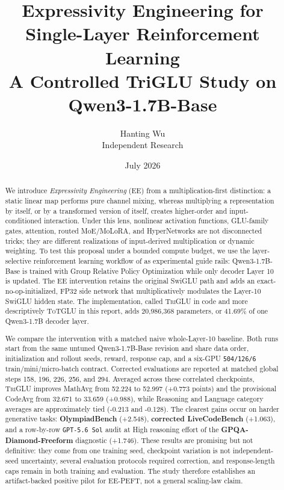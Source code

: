 \documentclass[10pt]{article}
\title{\vspace{-1.5em}\textbf{Expressivity Engineering for Single-Layer Reinforcement Learning}\\
\large A Controlled TriGLU Study on Qwen3-1.7B-Base}
\author{Hanting Wu\\\small Independent Research}
\date{July 2026}
\newcommand{\EE}{\textit{Expressivity Engineering}}
\newcommand{\TriGLU}{\textsc{TriGLU}}
\newcommand{\ToTGLU}{\textsc{ToTGLU}}
\begin{document}
\maketitle

\begin{abstract}
We introduce \EE{} (EE) from a multiplication-first distinction: a static
linear map performs pure channel mixing, whereas multiplying a representation
by itself, or by a transformed version of itself, creates higher-order and
input-conditioned interaction.  Under this lens, nonlinear activation
functions, GLU-family gates, attention, routed MoE/MoLoRA, and HyperNetworks
are not disconnected tricks; they are different realizations of input-derived
multiplication or dynamic weighting.  To test this proposal under a bounded
compute budget, we use the layer-selective reinforcement learning workflow of
\citet{zhang2026onelayer} as experimental guide rails:
Qwen3-1.7B-Base is trained with Group Relative Policy Optimization while only
decoder Layer 10 is updated.  The EE intervention retains the original SwiGLU
path and adds an exact-no-op-initialized, FP32 side network that multiplicatively
modulates the Layer-10 SwiGLU hidden state.  The implementation, called
\TriGLU{} in code and more descriptively \ToTGLU{} in this report, adds
20,986,368 parameters, or 41.69\% of one Qwen3-1.7B decoder layer.

We compare the intervention with a matched naive whole-Layer-10 baseline.  Both
runs start from the same untuned Qwen3-1.7B-Base revision and share data order,
initialization and rollout seeds, reward, response cap, and a six-GPU
\texttt{504/126/6} train/mini/micro-batch contract.  Corrected evaluations are
reported at matched global steps 158, 196, 226, 256, and 294.  Averaged across
these correlated checkpoints, \TriGLU{} improves MathAvg from 52.224 to 52.997
(+0.773 points) and the provisional CodeAvg from 32.671 to 33.659 (+0.988),
while Reasoning and Language category averages are approximately tied
(-0.213 and -0.128).  The clearest gains occur on harder generative tasks:
\textbf{OlympiadBench} (+2.548), \textbf{corrected LiveCodeBench} (+1.063), and a
row-by-row \texttt{GPT-5.6 Sol} audit at High reasoning effort of the
\textbf{GPQA-Diamond-Freeform} diagnostic (+1.746).  These results are promising
but not definitive: they come from one training seed, checkpoint variation is
not independent-seed uncertainty, several evaluation protocols required
correction, and response-length caps remain in both training and evaluation.
The study therefore establishes an artifact-backed positive pilot for EE-PEFT, not
a general scaling-law claim.
\end{abstract}
\end{document}
